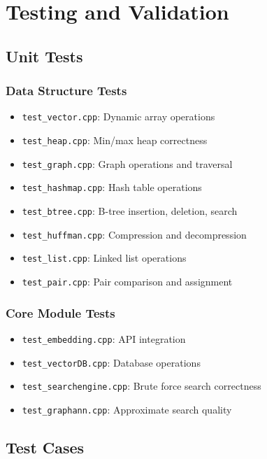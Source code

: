 \documentclass[12pt,a4paper]{article}
\begin{document}
\section{Testing and Validation}

\subsection{Unit Tests}

\subsubsection{Data Structure Tests}
\begin{itemize}
    \item \texttt{test\_vector.cpp}: Dynamic array operations
    \item \texttt{test\_heap.cpp}: Min/max heap correctness
    \item \texttt{test\_graph.cpp}: Graph operations and traversal
    \item \texttt{test\_hashmap.cpp}: Hash table operations
    \item \texttt{test\_btree.cpp}: B-tree insertion, deletion, search
    \item \texttt{test\_huffman.cpp}: Compression and decompression
    \item \texttt{test\_list.cpp}: Linked list operations
    \item \texttt{test\_pair.cpp}: Pair comparison and assignment
\end{itemize}

\subsubsection{Core Module Tests}
\begin{itemize}
    \item \texttt{test\_embedding.cpp}: API integration
    \item \texttt{test\_vectorDB.cpp}: Database operations
    \item \texttt{test\_searchengine.cpp}: Brute force search correctness
    \item \texttt{test\_graphann.cpp}: Approximate search quality
\end{itemize}

\subsection{Test Cases}
\end{document}
